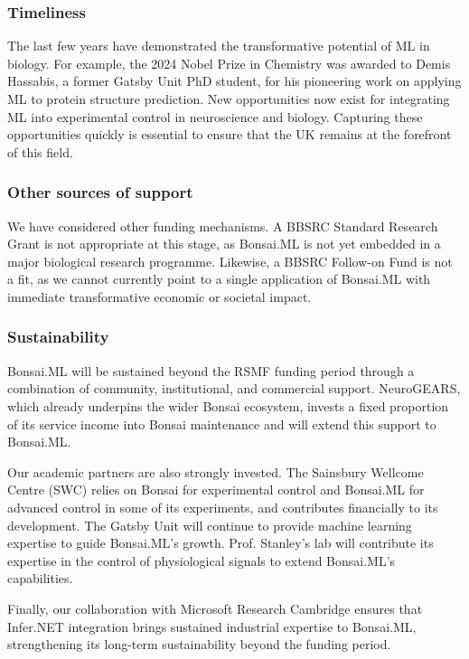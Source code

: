 \subsubsection*{Timeliness}

The last few years have demonstrated the transformative potential of ML in
biology. For example, the 2024 Nobel Prize in Chemistry was awarded to Demis
Hassabis, a former Gatsby Unit PhD student, for his pioneering work on applying
ML to protein structure prediction. New opportunities now exist for
integrating ML into experimental control in neuroscience and biology.
Capturing these opportunities quickly is essential to ensure that the UK
remains at the forefront of this field.

\subsubsection*{Other sources of support}

We have considered other funding mechanisms. A BBSRC Standard Research Grant is
not appropriate at this stage, as Bonsai.ML is not yet embedded in a major
biological research programme.
%
Likewise, a BBSRC Follow-on Fund is not a fit, as we cannot currently point to
a single application of Bonsai.ML with immediate transformative economic or
societal impact.

\subsubsection*{Sustainability}

Bonsai.ML will be sustained beyond the RSMF funding period through a
combination of community, institutional, and commercial support.
%
NeuroGEARS, which already underpins the wider Bonsai ecosystem, invests a fixed
proportion of its service income into Bonsai maintenance and will extend this
support to Bonsai.ML.

Our academic partners are also strongly invested.
%
The Sainsbury Wellcome Centre
(SWC) relies on Bonsai for experimental control and Bonsai.ML for advanced
control in some of its experiments, and contributes financially to its
development.
%
The Gatsby Unit will continue to provide machine learning
expertise to guide Bonsai.ML’s growth.
%
Prof. Stanley’s lab will contribute its expertise in the control of
physiological signals to extend Bonsai.ML’s capabilities.

Finally, our collaboration with Microsoft Research Cambridge ensures that 
Infer.NET integration brings sustained industrial expertise to Bonsai.ML, 
strengthening its long-term sustainability beyond the funding period.

